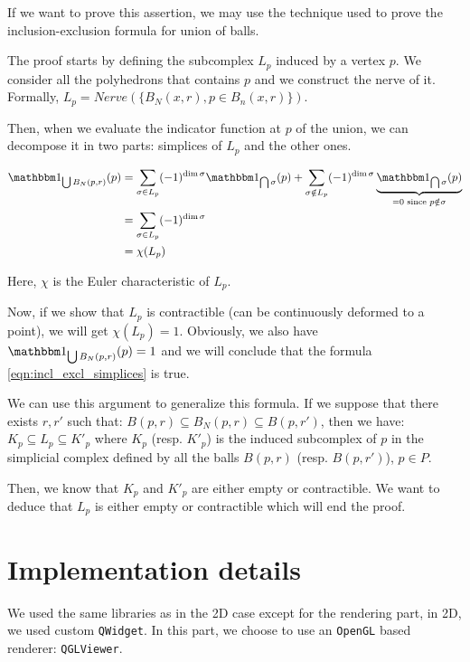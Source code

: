 If we want to prove this assertion, we may use the technique used to prove the
inclusion-exclusion formula for union of balls.

The proof starts by defining the subcomplex $ L_p $ induced by a vertex $ p $.
We consider all the polyhedrons that contains $ p $ and we construct the nerve of
it. Formally, $ L_p = Nerve(\{ B_N(x, r), p \in B_n(x, r)\}) $.

Then, when we evaluate the indicator function at $ p $ of the union, we can
decompose it in two parts: simplices of $ L_p $ and the other ones.

\begin{align*}
    \indicator{\bigcup B_N(p, r)}(p) &= \sum_{\sigma \in L_p} (-1)^{\dim \sigma}
    \indicator{\bigcap \sigma}(p) + \sum_{\sigma \notin L_p} (-1)^{\dim \sigma}
    \underbrace{\indicator{\bigcap \sigma}(p)}_{= 0 \text{ since } p \notin
        \sigma} \\
    &= \sum_{\sigma \in L_p} (-1)^{\dim \sigma} \\
    &= \chi(L_p)
\end{align*}

Here, $ \chi $ is the Euler characteristic of $ L_p $.

Now, if we show that $ L_p $ is contractible (can be continuously deformed to a
point), we will get $ \chi(L_p) = 1 $. Obviously, we also have $
\indicator{\bigcup B_N(p, r)}(p) = 1 $ and we will conclude that the formula
\ref{eqn:incl_excl_simplices} is true.

We can use this argument to generalize this formula. If we suppose that there
exists $ r, r' $ such that: $ B(p, r) \subseteq B_N(p, r) \subseteq B(p, r') $,
then we have: $ K_p \subseteq L_p \subseteq K'_p $ where $ K_p $ (resp. $ K'_p $)
is the induced subcomplex of $ p $ in the simplicial complex defined by all the
balls $ B(p, r) $ (resp. $ B(p, r') $), $ p \in P $.

Then, we know that $ K_p $ and $ K'_p $ are either empty or contractible. We
want to deduce that $ L_p $ is either empty or contractible which will end the
proof.


\section{Implementation details}

We used the same libraries as in the 2D case except for the rendering part, in
2D, we used custom \texttt{QWidget}. In this part, we choose to use an
\texttt{OpenGL} based renderer: \texttt{QGLViewer}.

